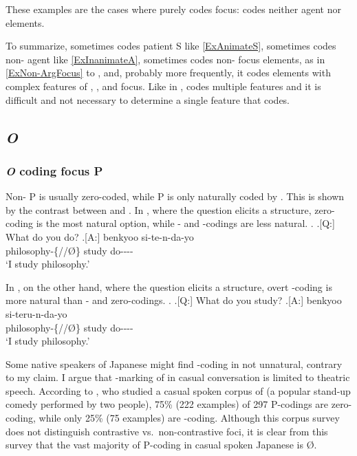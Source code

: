 These examples are the cases where  purely codes focus:
 codes neither agent nor  elements.


To summarize,
 sometimes codes  patient S like \ref{ExAnimateS},
sometimes codes non- agent like \ref{ExInanimateA},
sometimes codes non-  focus elements, as in \ref{ExNon-ArgFocus} to \Last, and,
probably more frequently,
it codes elements with complex features of , , and focus.
Like  in ,
 codes multiple features
and it is difficult and not necessary to determine a single feature that  codes.


\subsection{\textit{O}}

\subsubsection{\textit{O} coding focus P}

Non- P is usually zero-coded,
while  P is only naturally coded by .
This is shown by the contrast between \Next and \NNext.
In \Next,
where the question elicits a  structure,
zero-coding is the most natural option,
while - and -codings are less natural.
%
\ex.\label{ExfocusP}
	\a.[Q:] What do you do?
	\bg.[A:]  benkyoo si-te-n-da-yo \\
		philosophy-\{//\O\} study do---- \\
		`I study philosophy.'

In \Next,
on the other hand,
where the question elicits a  structure,
overt -coding is more natural than - and zero-codings.
%
\ex. 
	\a.[Q:] What do you study?
	\bg.[A:]  benkyoo si-teru-n-da-yo \\
		philosophy-\{//\O\} study do---- \\
		`I study philosophy.'


Some native speakers of Japanese might find -coding in \LLast not unnatural, contrary to my claim.
I argue that -marking of  in casual conversation
is limited to theatric speech.
According to ,
who studied a casual spoken corpus of 
(a popular stand-up comedy performed by two people),
75\% (222 examples) of 297 P-codings are zero-coding,
while only 25\% (75 examples) are -coding.
Although this corpus survey does not distinguish contrastive vs.\ non-contrastive foci,
it is clear from this survey that
the vast majority of P-coding in casual spoken Japanese is {\O}.

